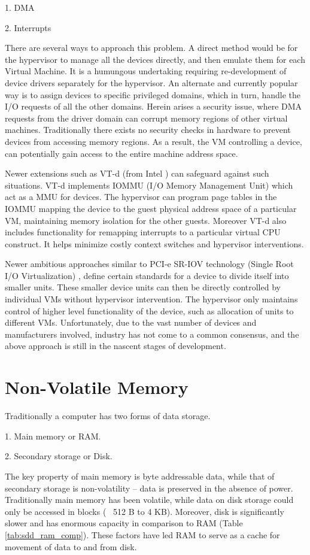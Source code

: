 1. DMA

2. Interrupts

There are several ways to approach this problem. A direct method would be for the hypervisor to manage all the devices directly, and then emulate them for each Virtual Machine. It is a humungous undertaking requiring re-development of device drivers separately for the hypervisor. An alternate and currently popular way is to assign devices to specific privileged domains, which in turn, handle the I/O requests of all the other domains. Herein arises a security issue, where DMA requests from the driver domain can corrupt memory regions of other virtual machines. Traditionally there exists no security checks in hardware to prevent devices from accessing memory regions. As a result, the VM controlling a device, can potentially gain access to the entire machine address space.

Newer extensions such as VT-d (from Intel \cite{intelvtd}) can safeguard against such situations. VT-d implements IOMMU (I/O Memory Management Unit) which act as a MMU for devices. The hypervisor can program page tables in the IOMMU mapping the device to the guest physical address space of a particular VM, maintaining memory isolation for the other guests. Moreover VT-d also includes functionality for remapping interrupts to a particular virtual CPU construct. It helps minimize costly context switches and hypervisor interventions.

Newer ambitious approaches similar to PCI-e SR-IOV technology (Single Root I/O Virtualization) \cite{sriov}, define certain standards for a device to divide itself into smaller units. These smaller device units can then be directly controlled by individual VMs without hypervisor intervention. The hypervisor only maintains control of higher level functionality of the device, such as allocation of units to different VMs. Unfortunately, due to the vast number of devices and manufacturers involved, industry has not come to a common consensus, and the above approach is still in the nascent stages of development. 

\section{Non-Volatile Memory}
Traditionally a computer has two forms of data storage.

1. Main memory or RAM.

2. Secondary storage or Disk.

The key property of main memory is byte addressable data, while that of secondary storage is non-volatility -- data is preserved in the absence of power. Traditionally main memory has been volatile, while data on disk storage could only be accessed in blocks (~ 512 B to 4 KB). Moreover, disk is significantly slower and has enormous capacity in comparison to RAM (Table \ref{tab:sdd_ram_comp}). These factors have led RAM to serve as a cache for movement of data to and from disk.

